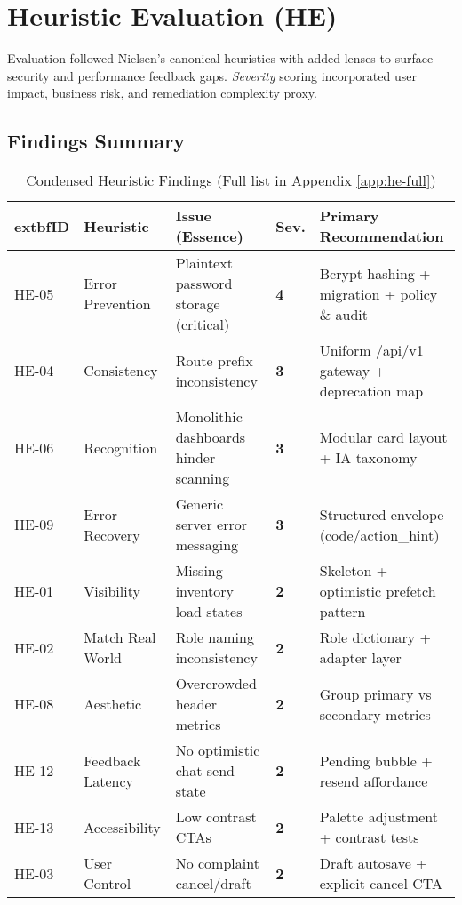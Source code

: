 \documentclass[11pt,a4paper]{article}
\newcommand{\sevbox}[1]{\begingroup\setlength{\fboxsep}{3pt}\colorbox{Sev#1}{\textbf{#1}}\endgroup}
\begin{document}
\section{Heuristic Evaluation (HE)}
Evaluation followed Nielsen's canonical heuristics with added lenses to surface security and performance feedback gaps. \textit{Severity} scoring incorporated user impact, business risk, and remediation complexity proxy.

\subsection{Findings Summary}
\begin{table}[h]
	\centering
	\renewcommand{\arraystretch}{1.12}
	\caption{Condensed Heuristic Findings (Full list in Appendix \ref{app:he-full})}\label{tab:he-condensed}
	\begin{tabular}{|p{1.1cm}|p{2.5cm}|p{5.2cm}|p{1.1cm}|p{5.2cm}|}
		\hline
			extbf{ID} & \textbf{Heuristic} & \textbf{Issue (Essence)} & \textbf{Sev.} & \textbf{Primary Recommendation} \\
		\hline
		HE-05 & Error Prevention & Plaintext password storage (critical) & \sevbox{4} & Bcrypt hashing + migration + policy \& audit \\
		\hline
		HE-04 & Consistency & Route prefix inconsistency & \sevbox{3} & Uniform /api/v1 gateway + deprecation map \\
		\hline
		HE-06 & Recognition & Monolithic dashboards hinder scanning & \sevbox{3} & Modular card layout + IA taxonomy \\
		\hline
		HE-09 & Error Recovery & Generic server error messaging & \sevbox{3} & Structured envelope (code/action_hint) \\
		\hline
		HE-01 & Visibility & Missing inventory load states & \sevbox{2} & Skeleton + optimistic prefetch pattern \\
		\hline
		HE-02 & Match Real World & Role naming inconsistency & \sevbox{2} & Role dictionary + adapter layer \\
		\hline
		HE-08 & Aesthetic & Overcrowded header metrics & \sevbox{2} & Group primary vs secondary metrics \\
		\hline
		HE-12 & Feedback Latency & No optimistic chat send state & \sevbox{2} & Pending bubble + resend affordance \\
		\hline
		HE-13 & Accessibility & Low contrast CTAs & \sevbox{2} & Palette adjustment + contrast tests \\
		\hline
		HE-03 & User Control & No complaint cancel/draft & \sevbox{2} & Draft autosave + explicit cancel CTA \\

\end{tabular}
\end{table}
\end{document}
